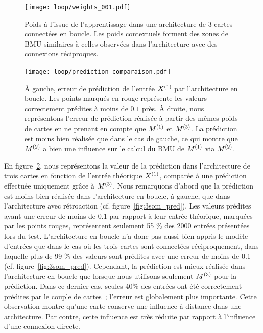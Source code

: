 \documentclass[../main]{subfiles}
\begin{document}
\begin{figure}
	\centering\texttt{[image: loop/weights\_001.pdf]}
	\caption{Poids à l'issue de l'apprentissage dans une architecture de 3 cartes connectées en boucle. Les poids contextuels forment des zones de BMU similaires à celles observées dans l'architecture avec des connexions réciproques.\label{fig:3som_loop}}
\end{figure}
\begin{figure}
	\centering\texttt{[image: loop/prediction\_comparaison.pdf]}
	\caption{\`A gauche, erreur de prédiction de l'entrée $X^{({1})}$ par l'architecture en boucle. Les points marqués en rouge représente les valeurs correctement prédites à moins de $0.1$ près. 
	\`A droite, nous représentons l'erreur de prédiction réalisée à partir des mêmes poids de cartes en ne prenant en compte que $M^{({1})}$ et $M^{({3})}$. La prédiction est moins bien réalisée que dans le cas de gauche, ce qui montre que $M^{({2})}$ a bien une influence sur le calcul du BMU de $M^{({1})}$ via $M^{({2})}$.
	\label{fig:pred_loop}}
\end{figure}

En figure~\ref{fig:pred_loop}, nous représentons la valeur de la prédiction dans l'architecture de trois cartes en fonction de l'entrée théorique $X^{({1})}$, comparée à une prédiction effectuée uniquement grâce à $M^{({3})}$.
Nous remarquons d'abord que la prédiction est moins bien réalisée dans l'architecture en boucle, à gauche, que dans l'architecture avec rétroaction (cf. figure~\ref{fig:3som_pred}).
Les valeurs prédites ayant une erreur de moins de 0.1 par rapport à leur entrée théorique, marquées par les points rouges, représentent seulement 55 \% des 2000 entrées présentées lors du test.
L'architecture en boucle n'a donc pas aussi bien appris le modèle d'entrées que dans le cas où les trois cartes sont connectées réciproquement, dans laquelle plus de 99 \% des valeurs sont prédites avec une erreur de moins de 0.1 (cf. figure~\ref{fig:3som_pred}).
Cependant, la prédiction est mieux réalisée dans l'architecture en boucle que lorsque nous utilisons seulement $M^{({3})}$ pour la prédiction.
Dans ce dernier cas, seules 40\% des entrées ont été correctement prédites par le couple de cartes~; l'erreur est globalement plus importante.
Cette observation montre qu'une carte conserve une influence à distance dans une architecture. Par contre, cette influence est très réduite par rapport à l'influence d'une connexion directe.
\end{document}
